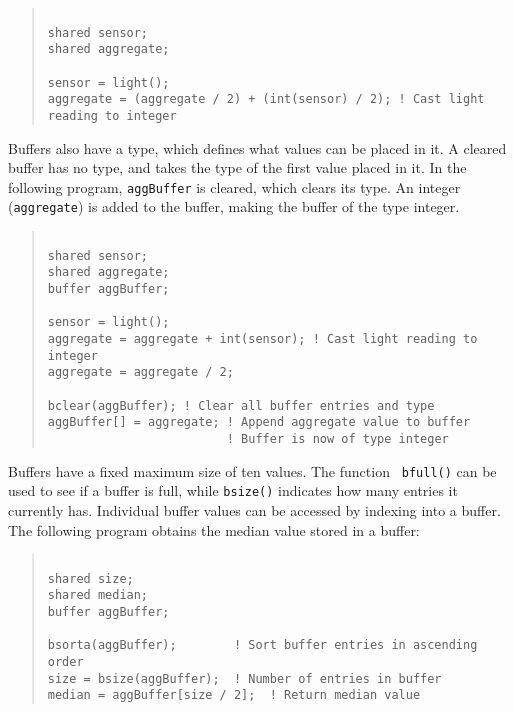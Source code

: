 \documentclass[12pt]{article}
\begin{document}
\begin{quotation}
\begin{verbatim}

shared sensor; 
shared aggregate;

sensor = light();
aggregate = (aggregate / 2) + (int(sensor) / 2); ! Cast light reading to integer

\end{verbatim}
\end{quotation}

Buffers also have a type, which defines what values can be placed in
it. A cleared buffer has no type, and takes the type of the first
value placed in it. In the following program, {\tt aggBuffer} is
cleared, which clears its type. An integer ({\tt aggregate}) is added
to the buffer, making the buffer of the type integer.

\begin{quotation}
\begin{verbatim}

shared sensor;
shared aggregate;
buffer aggBuffer;

sensor = light();
aggregate = aggregate + int(sensor); ! Cast light reading to integer
aggregate = aggregate / 2;

bclear(aggBuffer); ! Clear all buffer entries and type
aggBuffer[] = aggregate; ! Append aggregate value to buffer
                         ! Buffer is now of type integer

\end{verbatim}
\end{quotation}

Buffers have a fixed maximum size of ten values. The function {\tt
bfull()} can be used to see if a buffer is full, while {\tt bsize()}
indicates how many entries it currently has. Individual buffer values
can be accessed by indexing into a buffer. The following program
obtains the median value stored in a buffer:

\begin{quotation}
\begin{verbatim}

shared size;
shared median;
buffer aggBuffer;
 
bsorta(aggBuffer);        ! Sort buffer entries in ascending order
size = bsize(aggBuffer);  ! Number of entries in buffer
median = aggBuffer[size / 2];  ! Return median value

\end{verbatim}
\end{quotation}
\end{document}
